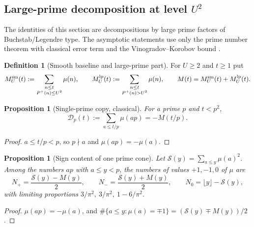 \documentclass[11pt,reqno]{amsart}
\makeatletter
\let\CG@origcite\cite
\renewcommand*{\cite}[2][]{\def\CG@citekey{#2}%
  \ifx\relax#1\relax\CG@origcite{#2}\else\CG@origcite[#1]{#2}\fi}
\numberwithin{equation}{section}
\theoremstyle{plain}
\newtheorem{proposition}[theorem]{Proposition}
\theoremstyle{definition}
\newtheorem{definition}[theorem]{Definition}
\theoremstyle{remark}
\newcommand{\Pp}{P^{+}}
\newcommand{\Sq}{\mathcal{S}}
\makeatother
\begin{document}
\subsection{Large-prime decomposition at level \texorpdfstring{$U^2$}{U squared}}
\label{sec:prime_copy_propagation}

The identities of this section are decompositions by large prime factors of
Buchstab/Legendre type. The asymptotic statements use only the prime number
theorem with classical error term and the Vinogradov--Korobov bound
\cite{MontgomeryVaughan2007,Walfisz1963}.

\begin{definition}[Smooth baseline and large-prime part]
\label{def:baseline_channel}
For $U\ge2$ and $t\ge1$ put
\begin{equation}
\label{eq:baseline_channel_def}
  M^{\rm sm}_U(t):=\sum_{\substack{n\le t\\ \Pp(n)\le U^2}}\mu(n),\qquad
  M^{\rm lp}_U(t):=\sum_{\substack{n\le t\\ \Pp(n)>U^2}}\mu(n),\qquad
  M(t)=M^{\rm sm}_U(t)+M^{\rm lp}_U(t).
\end{equation}
\end{definition}

\begin{proposition}[Single-prime copy, classical]
\label{prop:single_prime_copy}
For a prime $p$ and $t<p^2$,
\begin{equation}
\label{eq:single-prime-copy}
  \mathcal D_p(t):=\sum_{a\le t/p}\mu(ap)=-M(t/p).
\end{equation}
\end{proposition}

\begin{proof}
$a\le t/p<p$, so $p\nmid a$ and $\mu(ap)=-\mu(a)$.
\end{proof}

\begin{proposition}[Sign content of one prime cone]
\label{prop:prime-cone-signs}
Let $\Sq(y)=\sum_{a\le y}\mu(a)^2$. Among the numbers $ap$ with $a\le y<p$,
the numbers of values $+1,-1,0$ of $\mu$ are
\begin{equation}
\label{eq:cone_counts}
  N_+=\frac{\Sq(y)-M(y)}{2},\qquad N_-=\frac{\Sq(y)+M(y)}{2},\qquad
  N_0=\lfloor y\rfloor-\Sq(y),
\end{equation}
with limiting proportions $3/\pi^2,\ 3/\pi^2,\ 1-6/\pi^2$.
\end{proposition}

\begin{proof}
$\mu(ap)=-\mu(a)$, and $\#\{a\le y:\mu(a)=\mp1\}=(\Sq(y)\mp M(y))/2$.
\end{proof}
\end{document}
